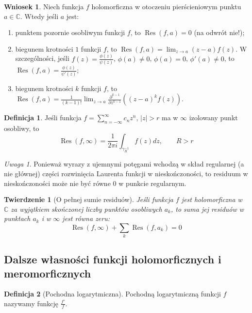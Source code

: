 \documentclass[11pt]{article}
\newcommand{\abs}[1]{\left|#1\right|} %
\newcommand{\res}{\mathop{\text{Res}}\limits} %
\theoremstyle{plain}
\newtheorem*{theorem}{Twierdzenie}
\theoremstyle{definition}
\newtheorem*{definition}{Definicja}
\newtheorem*{corollary}{Wniosek}
\theoremstyle{remark}
\newtheorem*{remark}{Uwaga}
\begin{document}
\begin{corollary}
  Niech funkcja $ f $ holomorficzna w otoczeniu pierścieniowym punktu $ a \in \mathbb{C} $. Wtedy jeśli $ a $ jest:
  \begin{enumerate}
    \item punktem pozornie osobliwym funkcji $f$, to $ \res(f, a) = 0 $ (na odwrót nie!);
    \item biegunem krotności $ 1 $ funkcji $ f $, to $ \res(f, a) = \lim_{z \to a} (z-a)f(z) $.
    W szczególności, jeśli $ f(z) = \frac{\phi(z)}{\psi(z)} $, $ \phi(a) \neq 0 $, $ \phi(a) = 0 $, $ \phi'(a) \neq 0 $, to $ \res(f, a) = \frac{\phi(z)}{\psi'(z)} $;
    \item biegunem krotności $k$ funkcji $f$, to $ \res(f, a) = \frac{1}{(k-1)!} \lim_{z \to a} \frac{\partial^{k-1}}{\partial z^{k-1}}\left( (z-a)^k f(z) \right)$.
  \end{enumerate}
  
\end{corollary}

\begin{definition}
  Jeśli funkcja $ f = \sum_{n=-\infty}^{\infty} c_n z^n $, $ \abs{z} > r $ ma w $ \infty $ izolowany punkt osobliwy, to
  $$
    \res(f, \infty) = \frac{1}{2 \pi i} \int_{\gamma_R^{-1}} f(z) dz,
    \qquad R > r
  $$
\end{definition}

\begin{remark}
   Ponieważ wyrazy z ujemnymi potęgami wchodzą w skład regularnej (a nie głównej) części rozwinięcia Laurenta funkcji w nieskończoności, to residuum w nieskończoności może nie być równe $0$ w punkcie regularnym.
\end{remark}

\begin{theorem}[O pełnej sumie residuów]
  Jeśli funkcja $f$ jest holomorficzna w $ \mathbb{C} $ za wyjątkiem skończonej liczby punktów osobliwych $ a_k $,
  to suma jej residuów w punktach $ a_k $ i w $ \infty $ jest równa zeru:
  $$
    \res(f, \infty) + \sum_k \res(f, a_k) = 0
  $$
\end{theorem}

\subsection{Dalsze własności funkcji holomorficznych i meromorficznych}

\begin{definition}[Pochodna logarytmiczna]
  Pochodną logarytmiczną funkcji $f$ nazywamy funkcję $ \frac{f'}{f} $.
\end{definition}
\end{document}
